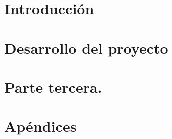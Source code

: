 \documentclass[12pt,a4paper]{book} %
\begin{document}
\frontmatter

%







%









\mainmatter

%

\part{Introducción}



\part{Desarrollo del proyecto}












\part{Parte tercera.}


\part{Apéndices}

\appendix



%

%

\backmatter




\end{document}
